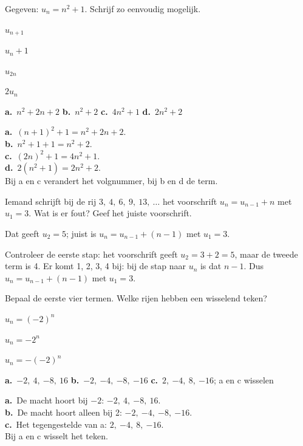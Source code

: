 \begin{oefeningen}
\begin{oefening}[1]\label{oef:h1-subst}
Gegeven: $u_n = n^2 + 1$. Schrijf zo eenvoudig mogelijk.
\begin{reeks}[4]
  \item $u_{n+1}$
  \item $u_n + 1$
  \item $u_{2n}$
  \item $2u_n$
\end{reeks}
\begin{solution}
\textbf{a.}~$n^2+2n+2$ \quad \textbf{b.}~$n^2+2$ \quad \textbf{c.}~$4n^2+1$ \quad \textbf{d.}~$2n^2+2$
\end{solution}
\begin{fullsolution}
\textbf{a.}~$(n+1)^2+1=n^2+2n+2$.\\
\textbf{b.}~$n^2+1+1=n^2+2$.\\
\textbf{c.}~$(2n)^2+1=4n^2+1$.\\
\textbf{d.}~$2(n^2+1)=2n^2+2$.\\
Bij a en c verandert het volgnummer, bij b en d de term.
\end{fullsolution}
\end{oefening}

\begin{oefening}[1]
Iemand schrijft bij de rij $3,\ 4,\ 6,\ 9,\ 13,\ \ldots$ het voorschrift $u_n = u_{n-1} + n$ met $u_1 = 3$. Wat is er fout? Geef het juiste voorschrift.
\begin{solution}
Dat geeft $u_2=5$; juist is $u_n=u_{n-1}+(n-1)$ met $u_1=3$.
\end{solution}
\begin{fullsolution}
Controleer de eerste stap: het voorschrift geeft $u_2=3+2=5$, maar de tweede term is 4. Er komt 1, 2, 3, 4 bij: bij de stap naar $u_n$ is dat $n-1$. Dus $u_n=u_{n-1}+(n-1)$ met $u_1=3$.
\end{fullsolution}
\end{oefening}

\begin{oefening}[1]
Bepaal de eerste vier termen. Welke rijen hebben een wisselend teken?
\begin{reeks}
  \item $u_n = (-2)^n$
  \item $u_n = -2^n$
  \item $u_n = -(-2)^n$
\end{reeks}
\begin{solution}
\textbf{a.}~$-2,\ 4,\ {-8},\ 16$ \quad \textbf{b.}~$-2,\ {-4},\ {-8},\ {-16}$ \quad \textbf{c.}~$2,\ {-4},\ 8,\ {-16}$; a en c wisselen
\end{solution}
\begin{fullsolution}
\textbf{a.}~De macht hoort bij $-2$: $-2,\ 4,\ {-8},\ 16$.\\
\textbf{b.}~De macht hoort alleen bij 2: $-2,\ {-4},\ {-8},\ {-16}$.\\
\textbf{c.}~Het tegengestelde van a: $2,\ {-4},\ 8,\ {-16}$.\\
Bij a en c wisselt het teken.
\end{fullsolution}
\end{oefening}


\end{oefeningen}
